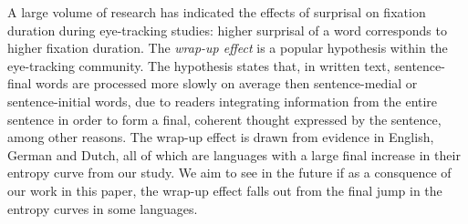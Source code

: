 \documentclass[10pt, letterpaper]{article}
\begin{document}
A large volume of research has indicated the effects of surprisal on
fixation duration during eye-tracking studies: higher surprisal of a
word corresponds to higher fixation duration. The \emph{wrap-up effect}
is a popular hypothesis within the eye-tracking community. The
hypothesis states that, in written text, sentence-final words are
processed more slowly on average then sentence-medial or
sentence-initial words, due to readers integrating information from the
entire sentence in order to form a final, coherent thought expressed by
the sentence, among other reasons. The wrap-up effect is drawn from
evidence in English, German and Dutch, all of which are languages with a
large final increase in their entropy curve from our study. We aim to
see in the future if as a consquence of our work in this paper, the
wrap-up effect falls out from the final jump in the entropy curves in
some languages.

\setlength{\parindent}{-0.1in} \setlength{\leftskip}{0.125in} \noindent


\end{document}
